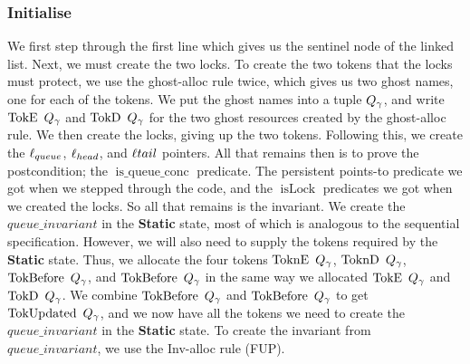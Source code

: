 \documentclass[twoside,11pt,openright]{report}
\newcommand{\isLock}{\operatorname{isLock}}
\newcommand{\isqueueconc}{\operatorname{is\_queue\_conc}}
\newcommand{\StaticState}{\textbf{Static}}
\newcommand{\Qg}{Q_\gname}
\newcommand{\TokE}[1]{\operatorname{TokE}\ #1}
\newcommand{\TokEQg}{\TokE{\Qg}}
\newcommand{\ToknE}[1]{\operatorname{ToknE}\ #1}
\newcommand{\ToknEQg}{\ToknE{\Qg}}
\newcommand{\TokD}[1]{\operatorname{TokD}\ #1}
\newcommand{\TokDQg}{\TokD{\Qg}}
\newcommand{\ToknD}[1]{\operatorname{ToknD}\ #1}
\newcommand{\ToknDQg}{\ToknD{\Qg}}
\newcommand{\TokBefore}[1]{\operatorname{TokBefore}\ #1}
\newcommand{\TokBeforeQg}{\TokBefore{\Qg}}
\newcommand{\TokAfterQg}{\TokBefore{\Qg}}
\newcommand{\TokUpdated}[1]{\operatorname{TokUpdated}\ #1}
\newcommand{\TokUpdatedQg}{\TokUpdated{\Qg}}
\begin{document}
\subsubsection{Initialise}
We first step through the first line which gives us the sentinel node of the linked list. Next, we must create the two locks. To create the two tokens that the locks must protect, we use the ghost-alloc rule twice, which gives us two ghost names, one for each of the tokens. We put the ghost names into a tuple $\Qg$, and write $\TokEQg$ and $\TokDQg$ for the two ghost resources created by the ghost-alloc rule. We then create the locks, giving up the two tokens. Following this, we create the $\ell_{queue}$, $\ell_{head}$, and $\ell{tail}$ pointers. All that remains then is to prove the postcondition; the $\isqueueconc$ predicate. The persistent points-to predicate we got when we stepped through the code, and the $\isLock$ predicates we got when we created the locks. So all that remains is the invariant. We create the $queue\_invariant$ in the \StaticState{} state, most of which is analogous to the sequential specification. However, we will also need to supply the tokens required by the \StaticState{} state. Thus, we allocate the four tokens $\ToknEQg$, $\ToknDQg$, $\TokBeforeQg$, and $\TokAfterQg$ in the same way we allocated $\TokEQg$ and $\TokDQg$. We combine $\TokBeforeQg$ and $\TokAfterQg$ to get $\TokUpdatedQg$, and we now have all the tokens we need to create the $queue\_invariant$ in the \StaticState{} state. To create the invariant from $queue\_invariant$, we use the Inv-alloc rule (FUP).
\end{document}
